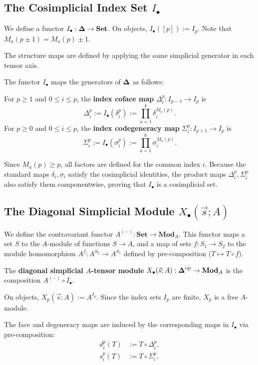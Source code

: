 \subsection{\texorpdfstring{The Cosimplicial Index Set $I_\bullet$}{The Cosimplicial Index Set I-bullet}}

We define a functor $I_\bullet: \boldsymbol{\Delta} \to \mathbf{Set}$. On objects, $I_\bullet([p]) := I_p$. Note that $M_a(p\pm 1) = M_a(p)\pm 1$.

The structure maps are defined by applying the same simplicial generator in each tensor axis.


\begin{definition}
The functor $I_\bullet$ maps the generators of $\boldsymbol{\Delta}$ as follows:

For $p\ge 1$ and $0\le i\le p$, the \textbf{index coface map} $\Delta_i^p: I_{p-1} \to I_p$ is
\[
\Delta_i^p := I_\bullet(\delta_i^p) := \prod_{a=1}^k \delta_i^{M_a(p)}.
\]
For $p\ge 0$ and $0\le i\le p$, the \textbf{index codegeneracy map} $\Sigma_i^p: I_{p+1} \to I_p$ is
\[
\Sigma_i^p := I_\bullet(\sigma_i^p) := \prod_{a=1}^k \sigma_i^{M_a(p)}.
\]
\end{definition}

Since $M_a(p)\ge p$, all factors are defined for the common index $i$. Because the standard maps $\delta_i, \sigma_i$ satisfy the cosimplicial identities, the product maps $\Delta_i^p, \Sigma_i^p$ also satisfy them componentwise, proving that $I_\bullet$ is a cosimplicial set.

\subsection{\texorpdfstring{The Diagonal Simplicial Module $X_\bullet(\vec{s};A)$}{The Diagonal Simplicial Module}}

We define the contravariant functor $A^{(-)}: \mathbf{Set} \to \mathbf{Mod}_A$. This functor maps a set $S$ to the $A$-module of functions $S\to A$, and a map of sets $f: S_1 \to S_2$ to the module homomorphism $A^f: A^{S_2} \to A^{S_1}$ defined by pre-composition ($T \mapsto T\circ f$).

\begin{definition}
The \textbf{diagonal simplicial $A$-tensor module} $X_\bullet(\vec{s};A):\boldsymbol{\Delta}^{\mathrm{op}}\to\mathbf{Mod}_A$ is the composition $A^{(-)} \circ I_\bullet$.

On objects, $X_p(\vec{s};A):=A^{I_p}$. Since the index sets $I_p$ are finite, $X_p$ is a free $A$-module.

The face and degeneracy maps are induced by the corresponding maps in $I_\bullet$ via pre-composition:
\begin{align*}
d_i^p(T) &:= T\circ \Delta_i^p, \\
s_i^p(T) &:= T\circ \Sigma_i^p.
\end{align*}
\end{definition}

